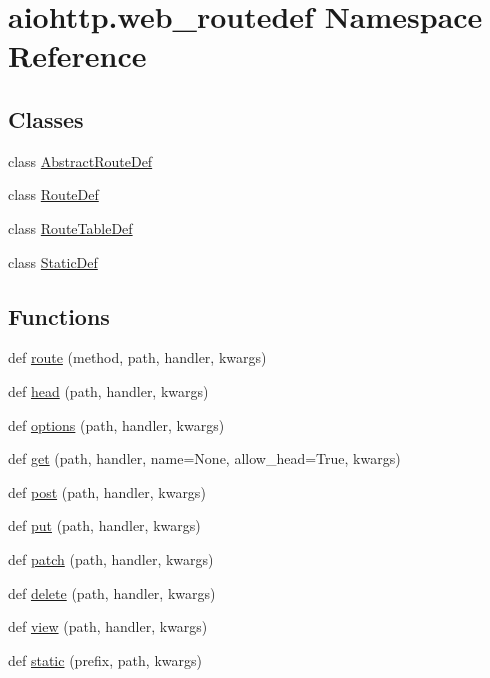 \hypertarget{namespaceaiohttp_1_1web__routedef}{}\section{aiohttp.\+web\+\_\+routedef Namespace Reference}
\label{namespaceaiohttp_1_1web__routedef}
\subsection*{Classes}
\begin{DoxyCompactItemize}
\item 
class \hyperlink{classaiohttp_1_1web__routedef_1_1_abstract_route_def}{Abstract\+Route\+Def}
\item 
class \hyperlink{classaiohttp_1_1web__routedef_1_1_route_def}{Route\+Def}
\item 
class \hyperlink{classaiohttp_1_1web__routedef_1_1_route_table_def}{Route\+Table\+Def}
\item 
class \hyperlink{classaiohttp_1_1web__routedef_1_1_static_def}{Static\+Def}
\end{DoxyCompactItemize}
\subsection*{Functions}
\begin{DoxyCompactItemize}
\item 
def \hyperlink{namespaceaiohttp_1_1web__routedef_af66ac5c432938429bfd617b90c26aad1}{route} (method, path, handler, kwargs)
\item 
def \hyperlink{namespaceaiohttp_1_1web__routedef_ae3263e1ab1b4e549fff8469842f865cb}{head} (path, handler, kwargs)
\item 
def \hyperlink{namespaceaiohttp_1_1web__routedef_a8051b01e1ed6f841edbb560687a8ee73}{options} (path, handler, kwargs)
\item 
def \hyperlink{namespaceaiohttp_1_1web__routedef_a82f495c68cd2369f66dc36a2a27bf654}{get} (path, handler, name=None, allow\+\_\+head=True, kwargs)
\item 
def \hyperlink{namespaceaiohttp_1_1web__routedef_ae9850464a55cfaaec3b37cf189d8f4ee}{post} (path, handler, kwargs)
\item 
def \hyperlink{namespaceaiohttp_1_1web__routedef_a8bd014a91940d1880e38f6eef8a8abf3}{put} (path, handler, kwargs)
\item 
def \hyperlink{namespaceaiohttp_1_1web__routedef_a33d3a2b91b9b7f065e0143098ab6a557}{patch} (path, handler, kwargs)
\item 
def \hyperlink{namespaceaiohttp_1_1web__routedef_ad024cd501fd403282fe516c2a14a2238}{delete} (path, handler, kwargs)
\item 
def \hyperlink{namespaceaiohttp_1_1web__routedef_aaab072ff7b949dc58a6cf17156785c28}{view} (path, handler, kwargs)
\item 
def \hyperlink{namespaceaiohttp_1_1web__routedef_a1d53856a2ff325c7ad726a9f1df260e5}{static} (prefix, path, kwargs)
\end{DoxyCompactItemize}


